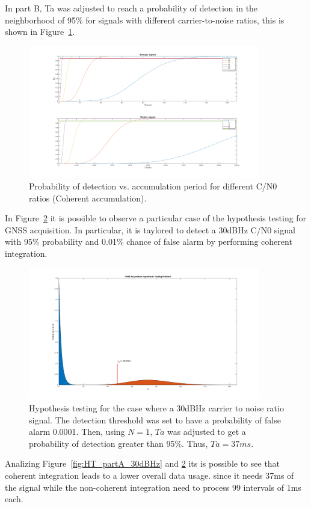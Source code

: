 In part B, Ta was adjusted to reach a probability of detection in the neighborhood
of 95\% for signals with different carrier-to-noise ratios, this is shown in
Figure~\ref{fig:pd_vs_Ta}.

\begin{figure}[H]
	\centering
	\includegraphics[width=0.9\textwidth]{figs/Pd_vs_Ta.png}
	\caption{Probability of detection vs. accumulation period for
		different C/N0 ratios (Coherent accumulation).}
	\label{fig:pd_vs_Ta}
\end{figure}

In Figure~\ref{fig:HT_partB_30dBHz} it is possible to observe a particular case
of the hypothesis testing for GNSS acquisition. In particular, it is taylored
to detect a 30dBHz C/N0 signal with 95\% probability and 0.01\% chance of false
alarm by performing coherent integration.

\begin{figure}[H]
	\centering
	\includegraphics[width=0.9\textwidth]{figs/HT_partB_30dBHz.png}
	\caption{Hypothesis testing for the case where a 30dBHz carrier to noise ratio
		signal. The detection threshold was set to have a probability of false alarm
		0.0001. Then, using $N=1$, $Ta$ was adjusted to get a probability of detection
		greater than 95\%. Thus, $Ta=37ms$.}
	\label{fig:HT_partB_30dBHz}
\end{figure}


Analizing Figure~\ref{fig:HT_partA_30dBHz} and \ref{fig:HT_partB_30dBHz} its is
possible to see that coherent integration leads to a lower overall data usage.
since it needs 37ms of the signal while the non-coherent integration need to
process 99 intervals of 1ms each.
